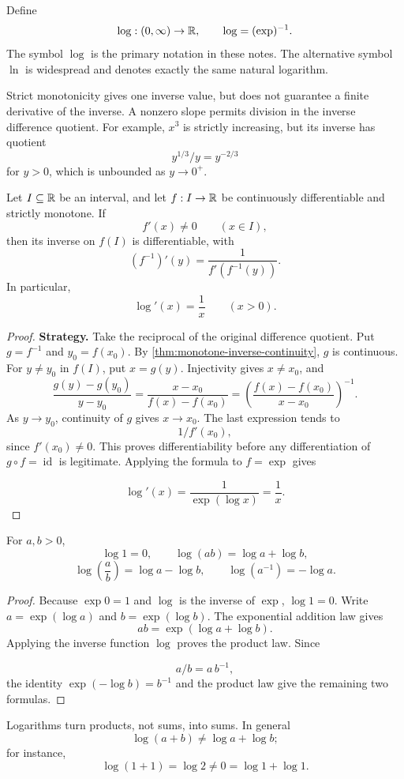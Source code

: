 \begin{definition}
Define
\[
\log:(0,\infty)\to\mathbb{R},
\qquad
\log=(\exp)^{-1}.
\]
The symbol \(\log\) is the primary notation in these notes. The alternative
symbol \(\ln\) is widespread and denotes exactly the same natural logarithm.
\end{definition}

Strict monotonicity gives one inverse value, but does not guarantee a
finite derivative of the inverse. A nonzero slope permits division in
the inverse difference quotient. For example, $x^3$ is strictly increasing,
but its inverse has quotient
\[
y^{1/3}/y=y^{-2/3}
\]
 for $y>0$, which
is unbounded as $y\to0^+$.

\begin{theorem}
\label{thm:log-and-inverses}
Let $I\subseteq\mathbb{R}$ be an interval, and let $f:I\to\mathbb{R}$ be continuously differentiable and strictly monotone. If
\[
f'(x)\ne0
\qquad(x\in I),
\]
then its inverse on $f(I)$ is differentiable, with
\[
(f^{-1})'(y)=\frac{1}{f'(f^{-1}(y))}.
\]
In particular,
\[
\log'(x)=\frac1x
\qquad(x>0).
\]
\end{theorem}
\begin{proof}
\textbf{Strategy.} Take the reciprocal of the original difference quotient.
Put $g=f^{-1}$ and $y_0=f(x_0)$. By
\cref{thm:monotone-inverse-continuity}, $g$ is continuous. For $y\ne y_0$
in $f(I)$, put $x=g(y)$. Injectivity gives $x\ne x_0$, and
\[
\frac{g(y)-g(y_0)}{y-y_0}
=\frac{x-x_0}{f(x)-f(x_0)}
=\left(\frac{f(x)-f(x_0)}{x-x_0}\right)^{-1}.
\]
As $y\to y_0$, continuity of $g$ gives $x\to x_0$. The last expression
tends to
\[
1/f'(x_0),
\]
 since $f'(x_0)\ne0$. This proves differentiability
before any differentiation of $g\circ f=\operatorname{id}$ is legitimate.
Applying the formula to $f=\exp$ gives

\[
\log'(x)=\frac{1}{\exp(\log x)}=\frac1x.
\]

\end{proof}

\begin{proposition}
\label{prop:natural-log-laws}
For $a,b>0$,
\[
\log1=0,\qquad
\log(ab)=\log a+\log b,
\]
\[
\log\!\left(\frac ab\right)=\log a-\log b,
\qquad
\log(a^{-1})=-\log a.
\]
\end{proposition}
\begin{proof}
Because $\exp0=1$ and $\log$ is the inverse of $\exp$, $\log1=0$.
Write $a=\exp(\log a)$ and $b=\exp(\log b)$. The exponential addition
law gives
\[
ab=\exp(\log a+\log b).
\]
Applying the inverse function $\log$ proves the product law. Since

\[
a/b=a\,b^{-1},
\]
 the identity
$\exp(-\log b)=b^{-1}$ and the product law give the remaining two formulas.
\end{proof}
Logarithms turn products, not sums, into sums. In general
\[
\log(a+b)\ne\log a+\log b;
\]
for instance,
\[
\log(1+1)=\log2\ne0=\log1+\log1.
\]


